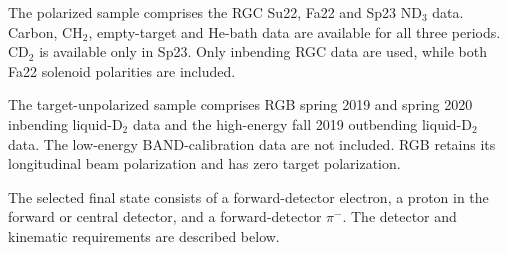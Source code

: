The polarized sample comprises the RGC Su22, Fa22 and Sp23 ND$_3$ data. Carbon, CH$_2$, empty-target and He-bath data are available for all three periods. CD$_2$ is available only in Sp23. Only inbending RGC data are used, while both Fa22 solenoid polarities are included.

The target-unpolarized sample comprises RGB spring 2019 and spring 2020 inbending liquid-D$_2$ data and the high-energy fall 2019 outbending liquid-D$_2$ data. The low-energy BAND-calibration data are not included. RGB retains its longitudinal beam polarization and has zero target polarization.

The selected final state consists of a forward-detector electron, a proton in the forward or central detector, and a forward-detector $\pi^-$. The detector and kinematic requirements are described below.
